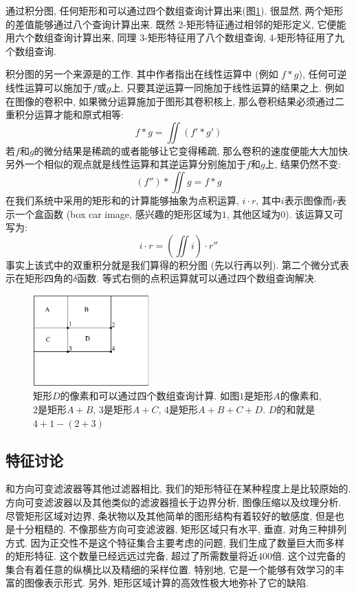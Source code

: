 \documentclass[a4paper,utf8,11pt]{ctexart}
\begin{document}
通过积分图, 任何矩形和可以通过四个数组查询计算出来(图\ref{fig:feature_calculate}). 很显然, 两个矩形的差值能够通过八个查询计算出来. 既然 2-矩形特征通过相邻的矩形定义, 它便能用六个数组查询计算出来, 同理 3-矩形特征用了八个数组查询, 4-矩形特征用了九个数组查询.

积分图的另一个来源是\citet{simard1999boxlets}的工作. 其中作者指出在线性运算中 (例如 $f\ast g$), 任何可逆线性运算可以施加于$f$或$g$上, 只要其逆运算一同施加于线性运算的结果之上. 例如在图像的卷积中, 如果微分运算施加于图形其卷积核上, 那么卷积结果必须通过二重积分运算才能和原式相等:
\[
    f\ast g = \iint(f'\ast g')
\]
若$f$和$g$的微分结果是稀疏的或者能够让它变得稀疏, 那么卷积的速度便能大大加快. 另外一个相似的观点就是线性运算和其逆运算分别施加于$f$和$g$上, 结果仍然不变:
\[
    (f'')\ast\iint g = f\ast g
\]
在我们系统中采用的矩形和的计算能够抽象为点积运算, $i\cdot r$, 其中$i$表示图像而$r$表示一个盒函数 (box car image, 感兴趣的矩形区域为$1$, 其他区域为$0$). 该运算又可写为:
\[
    i\cdot r = (\iint i)\cdot r''
\]
事实上该式中的双重积分就是我们算得的积分图 (先以行再以列). 第二个微分式表示在矩形四角的$\delta$函数. 等式右侧的点积运算就可以通过四个数组查询解决.
\begin{figure}[!t]
\centering
\includegraphics[width=0.4\textwidth]{feature_calculate.png}
\caption{矩形$D$的像素和可以通过四个数组查询计算. 如图$1$是矩形$A$的像素和, $2$是矩形$A+B$, $3$是矩形$A+C$, $4$是矩形$A+B+C+D$. $D$的和就是$4+1-(2+3)$}
\label{fig:feature_calculate}
\end{figure}

\subsection{特征讨论}
和方向可变滤波器\citep{freeman1991design,greenspan1994overcomplete}等其他过滤器相比, 我们的矩形特征在某种程度上是比较原始的. 方向可变滤波器以及其他类似的滤波器擅长于边界分析, 图像压缩以及纹理分析. 
尽管矩形区域对边界, 条状物以及其他简单的图形结构有着较好的敏感度, 但是也是十分粗糙的. 不像那些方向可变滤波器, 矩形区域只有水平, 垂直, 对角三种排列方式. 因为正交性不是这个特征集合主要考虑的问题, 我们生成了数量巨大而多样的矩形特征. 这个数量已经远远过完备, 超过了所需数量将近$400$倍.
这个过完备的集合有着任意的纵横比以及精细的采样位置. 特别地, 它是一个能够有效学习的丰富的图像表示形式. 另外, 矩形区域计算的高效性极大地弥补了它的缺陷. 
\end{document}

